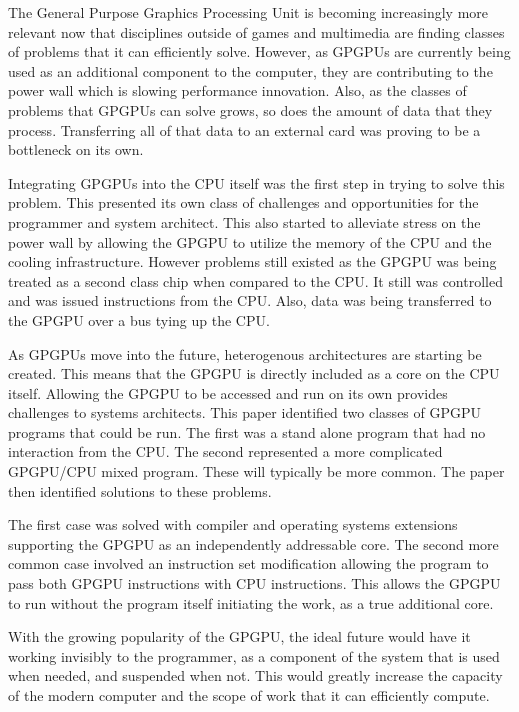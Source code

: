 The General Purpose Graphics Processing Unit is becoming increasingly more relevant now that disciplines outside of games and multimedia are finding classes of problems that it can efficiently solve. However, as GPGPUs are currently being used as an additional component to the computer, they are contributing to the power wall which is slowing performance innovation. Also, as the classes of problems that GPGPUs can solve grows, so does the amount of data that they process. Transferring all of that data to an external card was proving to be a bottleneck on its own. 

Integrating GPGPUs into the CPU itself was the first step in trying to solve this problem. This presented its own class of challenges and opportunities for the programmer and system architect. This also started to alleviate stress on the power wall by allowing the GPGPU to utilize the memory of the CPU and the cooling infrastructure. However problems still existed as the GPGPU was being treated as a second class chip when compared to the CPU. It still was controlled and was issued instructions from the CPU. Also, data was being transferred to the GPGPU over a bus tying up the CPU.

As GPGPUs move into the future, heterogenous architectures are starting be created. This means that the GPGPU is directly included as a core on the CPU itself. Allowing the GPGPU to be accessed and run on its own provides challenges to systems architects. This paper identified two classes of GPGPU programs that could be run. The first was a stand alone program that had no interaction from the CPU. The second represented a more complicated GPGPU/CPU mixed program. These will typically be more common. The paper then identified solutions to these problems. 

The first case was solved with compiler and operating systems extensions supporting the GPGPU as an independently addressable core. The second more common case involved an instruction set modification allowing the program to pass both GPGPU instructions with CPU instructions. This allows the GPGPU to run without the program itself initiating the work, as a true additional core. 

With the growing popularity of the GPGPU, the ideal future would have it working invisibly to the programmer, as a component of the system that is used when needed, and suspended when not. This would greatly increase the capacity of the modern computer and the scope of work that it can efficiently compute. 